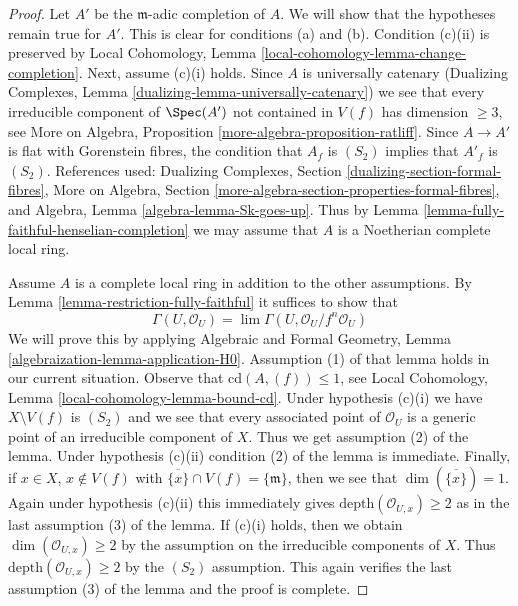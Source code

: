 \begin{proof}
Let $A'$ be the $\mathfrak m$-adic completion of $A$. We will show that
the hypotheses remain true for $A'$. This is clear for conditions
(a) and (b). Condition (c)(ii) is preserved by
Local Cohomology, Lemma \ref{local-cohomology-lemma-change-completion}.
Next, assume (c)(i) holds. Since $A$ is universally catenary
(Dualizing Complexes, Lemma \ref{dualizing-lemma-universally-catenary})
we see that every irreducible component of $\Spec(A')$ not contained in $V(f)$
has dimension $\geq 3$, see
More on Algebra, Proposition \ref{more-algebra-proposition-ratliff}.
Since $A \to A'$ is flat with Gorenstein fibres,
the condition that $A_f$ is $(S_2)$ implies that $A'_f$ is $(S_2)$.
References used:
Dualizing Complexes, Section \ref{dualizing-section-formal-fibres},
More on Algebra, Section \ref{more-algebra-section-properties-formal-fibres},
and Algebra, Lemma \ref{algebra-lemma-Sk-goes-up}.
Thus by Lemma \ref{lemma-fully-faithful-henselian-completion}
we may assume that $A$ is a Noetherian complete local ring.

\medskip\noindent
Assume $A$ is a complete local ring in addition to the other assumptions.
By Lemma \ref{lemma-restriction-fully-faithful} it suffices to show that
$$
\Gamma(U, \mathcal{O}_U) = \lim \Gamma(U, \mathcal{O}_U/f^n\mathcal{O}_U)
$$
We will prove this by applying
Algebraic and Formal Geometry, Lemma \ref{algebraization-lemma-application-H0}.
Assumption (1) of that lemma holds in our current situation.
Observe that $\text{cd}(A, (f)) \leq 1$, see
Local Cohomology, Lemma \ref{local-cohomology-lemma-bound-cd}.
Under hypothesis (c)(i) we have $X \setminus V(f)$ is $(S_2)$
and we see that every associated point of $\mathcal{O}_U$ is a
generic point of an irreducible component of $X$.
Thus we get assumption (2) of the lemma.
Under hypothesis (c)(ii) condition (2) of the lemma is immediate.
Finally, if $x \in X$, $x \not \in V(f)$
with $\overline{\{x\}} \cap V(f) = \{\mathfrak m\}$,
then we see that $\dim(\overline{\{x\}}) = 1$.
Again under hypothesis (c)(ii) this immediately gives
$\text{depth}(\mathcal{O}_{U, x}) \geq 2$ as in
the last assumption (3) of the lemma.
If (c)(i) holds, then we obtain $\dim(\mathcal{O}_{U, x}) \geq 2$
by the assumption on the irreducible components of $X$. Thus
$\text{depth}(\mathcal{O}_{U, x}) \geq 2$ by the $(S_2)$ assumption.
This again verifies the last assumption (3) of the lemma and the proof
is complete.
\end{proof}


